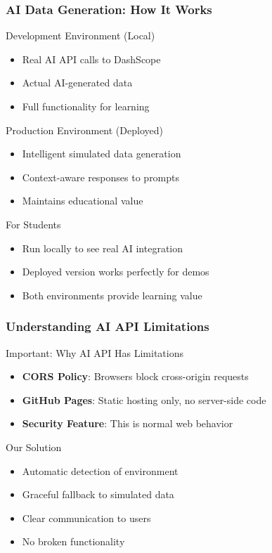 \documentclass[aspectratio=169]{beamer}
\begin{document}
\begin{frame}
\frametitle{AI Data Generation: How It Works}
\begin{alertblock}{Development Environment (Local)}
\begin{itemize}
\footnotesize
\item Real AI API calls to DashScope
\item Actual AI-generated data
\item Full functionality for learning
\end{itemize}
\end{alertblock}

\begin{exampleblock}{Production Environment (Deployed)}
\begin{itemize}
\footnotesize
\item Intelligent simulated data generation
\item Context-aware responses to prompts
\item Maintains educational value
\end{itemize}
\end{exampleblock}

\begin{alertblock}{For Students}
\begin{itemize}
\footnotesize
\item Run locally to see real AI integration
\item Deployed version works perfectly for demos
\item Both environments provide learning value
\end{itemize}
\end{alertblock}
\end{frame}

\begin{frame}
\frametitle{Understanding AI API Limitations}
\begin{alertblock}{Important: Why AI API Has Limitations}
\begin{itemize}
\item \textbf{CORS Policy}: Browsers block cross-origin requests
\item \textbf{GitHub Pages}: Static hosting only, no server-side code
\item \textbf{Security Feature}: This is normal web behavior
\end{itemize}
\end{alertblock}

\begin{exampleblock}{Our Solution}
\begin{itemize}
\item Automatic detection of environment
\item Graceful fallback to simulated data
\item Clear communication to users
\item No broken functionality
\end{itemize}
\end{exampleblock}
\end{frame}
\end{document}
